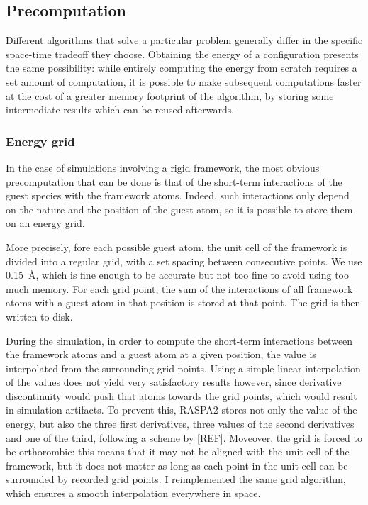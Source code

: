 \documentclass[main.tex]{subfiles}
\begin{document}
\subsection{Precomputation}

\label{precomputations}

Different algorithms that solve a particular problem generally differ in the specific space-time tradeoff they choose. Obtaining the energy of a configuration presents the same possibility: while entirely computing the energy from scratch requires a set amount of computation, it is possible to make subsequent computations faster at the cost of a greater memory footprint of the algorithm, by storing some intermediate results which can be reused afterwards.

\subsubsection{Energy grid}

\label{energygrid}

In the case of simulations involving a rigid framework, the most obvious precomputation that can be done is that of the short-term interactions of the guest species with the framework atoms. Indeed, such interactions only depend on the nature and the position of the guest atom, so it is possible to store them on an energy grid.

More precisely, fore each possible guest atom, the unit cell of the framework is divided into a regular grid, with a set spacing between consecutive points. We use \qty{0.15}{\angstrom}, which is fine enough to be accurate but not too fine to avoid using too much memory. For each grid point, the sum of the interactions of all framework atoms with a guest atom in that position is stored at that point. The grid is then written to disk.

During the simulation, in order to compute the short-term interactions between the framework atoms and a guest atom at a given position, the value is interpolated from the surrounding grid points. Using a simple linear interpolation of the values does not yield very satisfactory results however, since derivative discontinuity would push that atoms towards the grid points, which would result in simulation artifacts. To prevent this, RASPA2 stores not only the value of the energy, but also the three first derivatives, three values of the second derivatives and one of the third, following a scheme by [REF]. Moveover, the grid is forced to be orthorombic: this means that it may not be aligned with the unit cell of the framework, but it does not matter as long as each point in the unit cell can be surrounded by recorded grid points. I reimplemented the same grid algorithm, which ensures a smooth interpolation everywhere in space.
\end{document}
